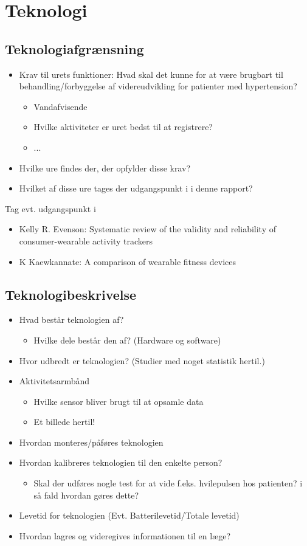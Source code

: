 
\chapter{Teknologi}

\section{Teknologiafgrænsning}
\begin{itemize}
\item Krav til urets funktioner: Hvad skal det kunne for at være brugbart til behandling/forbyggelse af videreudvikling for patienter med hypertension?
\begin{itemize}
\item Vandafvisende 
\item Hvilke aktiviteter er uret bedst til at registrere?
\item ...
\end{itemize}
\item Hvilke ure findes der, der opfylder disse krav? 
\item Hvilket af disse ure tages der udgangspunkt i i denne rapport?
\end{itemize}
Tag evt. udgangspunkt i 
\begin{itemize}
\item Kelly R. Evenson: Systematic review of the validity and reliability of consumer-wearable activity trackers 
\item K Kaewkannate: A comparison of wearable fitness devices
\end{itemize}

\section{Teknologibeskrivelse}
\begin{itemize}
\item Hvad består teknologien af?
\begin{itemize}
\item Hvilke dele består den af? (Hardware og software)
\end{itemize}
\item Hvor udbredt er teknologien? (Studier med noget statistik hertil.)
\item Aktivitetsarmbånd
\begin{itemize}
\item Hvilke sensor bliver brugt til at opsamle data
\item Et billede hertil!
\end{itemize}
\item Hvordan monteres/påføres teknologien 
\item Hvordan kalibreres teknologien til den enkelte person?
\begin{itemize}
\item Skal der udføres nogle test for at vide f.eks. hvilepulsen hos patienten? i så fald hvordan gøres dette?
\end{itemize}
\item Levetid for teknologien (Evt. Batterilevetid/Totale levetid)
\item Hvordan lagres og videregives informationen til en læge?
\end{itemize}

